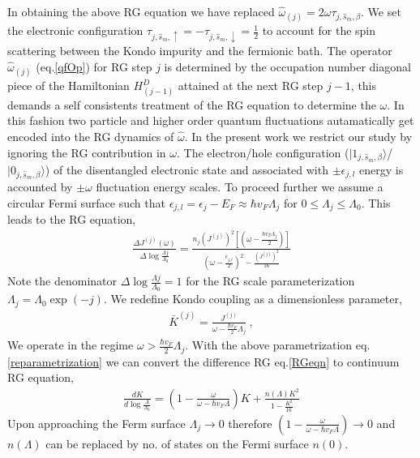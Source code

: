 \documentclass[aps,prl,preprint,groupedaddress]{revtex4-2}
\begin{document}
In obtaining the above RG equation we have replaced  $\hat{\omega}_{(j)}=2\omega\tau_{j,\hat{s}_{m},\beta}$. We set the electronic configuration $\tau_{j,\hat{s}_{m},\uparrow}=-\tau_{j,\hat{s}_{m},\downarrow}=\frac{1}{2}$ to account for the spin scattering between the Kondo impurity and the fermionic bath.  The operator $\hat{\omega}_{(j)}$ (eq.\eqref{qfOp}) for RG step $j$ is determined by the occupation number diagonal piece of the Hamiltonian  $H^{D}_{(j-1)}$ attained at the next RG step $j-1$, this demands a self consistents treatment of the RG equation to determine the $\omega$. In this fashion two particle and higher order quantum fluctuations autamatically get  encoded into the RG dynamics of $\hat{\omega}$. In the present work we restrict our study by ignoring the RG contribution in $\omega$. The electron/hole configuration ($|1_{j,\hat{s}_{m},\beta}\rangle$/$|0_{j,\hat{s}_{m},\beta}\rangle$)  of the disentangled electronic state and associated with $\pm \epsilon_{j,l}$ energy is accounted by $\pm\omega$ fluctuation energy scales. To proceed further we assume a circular Fermi surface such that $\epsilon_{j,l}=\epsilon_{j}-E_{F}\approx\hbar v_{F}\Lambda_{j}$ for $0\leq\Lambda_{j}\leq\Lambda_{0}$. This leads to the RG equation,
\begin{eqnarray}
\frac{\Delta J^{(j)}(\omega)}{\Delta\log\frac{\Lambda{j}}{\Lambda_{0}}}=\frac{n_{j}(J^{(j)})^{2}\left[(\omega - \frac{\hbar v_{F}\Lambda_{j}}{2})\right]}{(\omega - \frac{\epsilon_{j,l}}{2})^{2}-\frac{\left(J^{(j)}\right)^{2}}{16}}\label{RGeqn}
\end{eqnarray}
Note the denominator $\Delta\log\frac{\Lambda{j}}{\Lambda_{0}} =1$ for the RG scale parameterization $\Lambda_{j}=\Lambda_{0}\exp(-j)$. We redefine Kondo coupling as a dimensionless parameter,
\begin{eqnarray}
\bar{K}^{(j)}=\frac{J^{(j)}}{\omega-\frac{\hbar v_{F}}{2}\Lambda_{j}}~,\label{reparametrization}
\end{eqnarray} 
We operate in the regime $\omega>\frac{\hbar v_{F}}{2}\Lambda_{j}$. 
With the above parametrization eq.\eqref{reparametrization} we can convert the difference RG eq.\eqref{RGeqn} to continuum RG equation,
\begin{eqnarray}
\frac{d K}{d\log\frac{\Lambda}{\Lambda_{0}}}=\left(1-\frac{\omega}{\omega-\hbar v_{F}\Lambda}\right)K+\frac{n(\Lambda)K^{2}}{1-\frac{K^{2}}{16}}
\end{eqnarray}
Upon approaching the Ferm surface $\Lambda_{j}\to 0$ therefore $\left(1-\frac{\omega}{\omega-\hbar v_{F}\Lambda}\right)\to 0$ and $n(\Lambda)$ can be replaced by no. of states on the Fermi surface $n(0)$.
\end{document}
